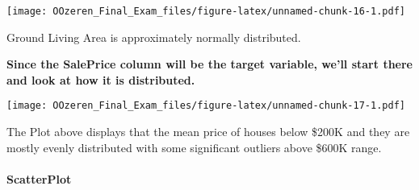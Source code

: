 \documentclass[]{article}
\newenvironment{Shaded}{\begin{snugshade}}{\end{snugshade}}
\newcommand{\KeywordTok}[1]{\textcolor[rgb]{0.13,0.29,0.53}{\textbf{#1}}}
\newcommand{\DataTypeTok}[1]{\textcolor[rgb]{0.13,0.29,0.53}{#1}}
\newcommand{\DecValTok}[1]{\textcolor[rgb]{0.00,0.00,0.81}{#1}}
\newcommand{\FloatTok}[1]{\textcolor[rgb]{0.00,0.00,0.81}{#1}}
\newcommand{\StringTok}[1]{\textcolor[rgb]{0.31,0.60,0.02}{#1}}
\newcommand{\CommentTok}[1]{\textcolor[rgb]{0.56,0.35,0.01}{\textit{#1}}}
\newcommand{\OperatorTok}[1]{\textcolor[rgb]{0.81,0.36,0.00}{\textbf{#1}}}
\newcommand{\NormalTok}[1]{#1}
\let\oldparagraph\paragraph
\renewcommand{\paragraph}[1]{\oldparagraph{#1}\mbox{}}
\begin{document}
\begin{Shaded}
\end{Shaded}

\texttt{[image: OOzeren\_Final\_Exam\_files/figure-latex/unnamed-chunk-16-1.pdf]}

Ground Living Area is approximately normally distributed.

\textbf{Since the SalePrice column will be the target variable, we'll
start there and look at how it is distributed.}

\begin{Shaded}
\end{Shaded}

\texttt{[image: OOzeren\_Final\_Exam\_files/figure-latex/unnamed-chunk-17-1.pdf]}

The Plot above displays that the mean price of houses below \$200K and
they are mostly evenly distributed with some significant outliers above
\$600K range.

\paragraph{ScatterPlot}\label{scatterplot}
\end{document}
